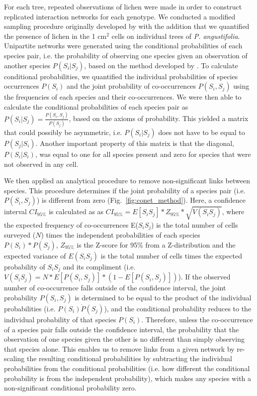 \documentclass[fleqn,12pt]{olplainarticle}
\begin{document}
For each tree, repeated observations of lichen were made in order to
construct replicated interaction networks for each genotype. We
conducted a modified sampling procedure originally developed by
\citep{Lamit2015a} with the addition that we quantified the presence
of lichen in the 1 cm$^2$ cells on individual trees of
\textit{P. angustifolia}. Unipartite networks were generated using the
conditional probabilities of each species pair, i.e. the probability
of observing one species given an observation of another species
$P(S_i | S_j)$, based on the method developed by
\citep{Araujo2011}. To calculate conditional probabilities, we
quantified the individual probabilities of species occurrences
$P(S_i)$ and the joint probability of co-occurrences $P(S_i, S_j)$
using the frequencies of each species and their co-occurrences. We
were then able to calculate the conditional probabilities of each
species pair as $P(S_i|S_j) = \frac{P(S_i,S_j)}{P(S_j)}$, based on the
axioms of probability. This yielded a matrix that could possibly be
asymmetric, i.e. $P(S_i|S_j)$ does not have to be equal to
$P(S_j|S_i)$. Another important property of this matrix is that the
diagonal, $P(S_{i} | S_{i})$, was equal to one for all species present
and zero for species that were not observed in any cell.

We then applied an analytical procedure to remove non-significant
links between species. This procedure determines if the joint
probability of a species pair (i.e. $P(S_i,S_j)$) is different from
zero (Fig.~\ref{fig:conet_method}).  Here, a confidence interval
$CI_{95\%}$ is calculated as as $CI_{95\%} = E[S_iS_j] * Z_{95\%} *
\sqrt{V(S_iS_j)}$, where the expected frequency of co-occurrences
E($S_iS_j$) is the total number of cells surveyed ($N$) times the
independent probabilities of each species $P(S_i) * P(S_j)$,
$Z_{95\%}$ is the Z-score for 95\% from a Z-distribution and the
expected variance of $E(S_iS_j)$ is the total number of cells times
the expected probability of $S_iS_j$ and its compliment
(i.e. $V(S_iS_j) = N * E[P(S_i,S_j)] * (1 - E[P(S_i,S_j)])$). If the
observed number of co-occurrence falls outside of the confidence
interval, the joint probability $P(S_i,S_j)$ is determined to be equal
to the product of the individual probabilities (i.e. $P(S_i) \dot
P(S_j)$), and the conditional probability reduces to the individual
probability of that species $P(S_i)$. Therefore, unless the
co-occurrence of a species pair falls outside the confidence interval,
the probability that the observation of one species given the other is
no different than simply observing that species alone. This enables us
to remove links from a given network by re-scaling the resulting
conditional probabilities by subtracting the individual probabilities
from the conditional probabilities (i.e. how different the conditional
probability is from the independent probability), which makes any
species with a non-significant conditional probability zero. 
\end{document}
